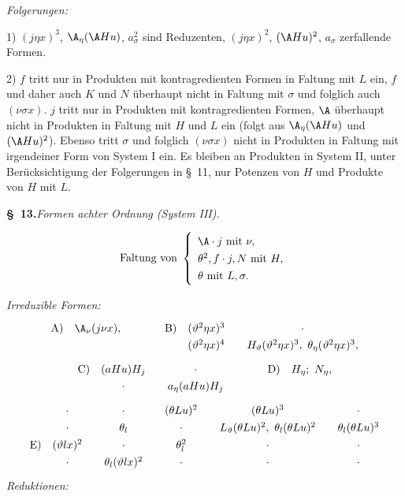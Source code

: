 \noindent\emph{Folgerungen:}

1) $(j\eta x)^3$, $\A_\eta(\A Hu)$, $a_\sigma^2$ sind Reduzenten, $(j\eta x)^2$, $(\A Hu)^2$, $a_\sigma$ zerfallende Formen.

2) $f$ tritt nur in Produkten mit kontragredienten Formen in Faltung mit $L$ ein, $f$ und daher auch $K$ und $N$ überhaupt nicht in Faltung mit $\sigma$ und folglich auch $(\nu\sigma x)$. $j$ tritt nur in Produkten mit kontragredienten Formen, $\A$ überhaupt nicht in Produkten in Faltung mit $H$ und $L$ ein (folgt aus $\A_\eta(\A Hu)$ und $(\A Hu)^2$). Ebenso tritt $\sigma$ und folglich $(\nu\sigma x)$ nicht in Produkten in Faltung mit irgendeiner Form von System I ein. Es bleiben an Produkten in System II, unter Berücksichtigung der Folgerungen in \S\ 11, nur Potenzen von $H$ und Produkte von $H$ mit $L$.

\begin{center}
\textbf{\S\ 13.}\quad\emph{Formen achter Ordnung (System III).}
\end{center}
\[
\text{Faltung von }\left\{\begin{array}{l}
\A\cdot j\text{ mit }\nu,\\
\theta^2,
 f\cdot j,
 N\text{ mit }H,\\
\theta\text{ mit }L,\sigma.
\end{array}\right.
\]


\noindent\emph{Irreduzible Formen:}
\[
\renewcommand{\arraystretch}{1.28}
\begin{array}{@{}r@{\quad}c@{\qquad\qquad}r@{\quad}c@{\qquad}c@{}}
\text{A)}&\A_\nu(j\nu x),&\text{B)}&(\vartheta^2\eta x)^3&\cdot\\
&&&(\vartheta^2\eta x)^4&H_\vartheta(\vartheta^2\eta x)^3,\ \theta_\eta(\vartheta^2\eta x)^3,
\end{array}
\]
\[
\renewcommand{\arraystretch}{1.28}
\begin{array}{@{}r@{\quad}c@{\qquad}c@{\qquad\qquad}r@{\quad}c@{}}
\text{C)}&(aHu)H_j&\cdot&\text{D)}&H_\eta;\ N_\eta,\\
&\cdot&a_\eta(aHu)H_j&&
\end{array}
\]
\[
\renewcommand{\arraystretch}{1.30}
\begin{array}{@{}r@{\quad}c@{\qquad}c@{\qquad}c@{\qquad}c@{\qquad}c@{}}
&\cdot&\cdot&(\theta Lu)^2&(\theta Lu)^3&\cdot\\
&\cdot&\theta_l&\cdot&L_\vartheta(\theta Lu)^2,\ \theta_l(\theta Lu)^2&\theta_l(\theta Lu)^3\\
\text{E)}&(\vartheta lx)^2&\cdot&\theta_l^2&\cdot&\cdot\\
&\cdot&\theta_l(\vartheta lx)^2&\cdot&\cdot&\cdot
\end{array}
\]
\noindent\emph{Reduktionen:}

